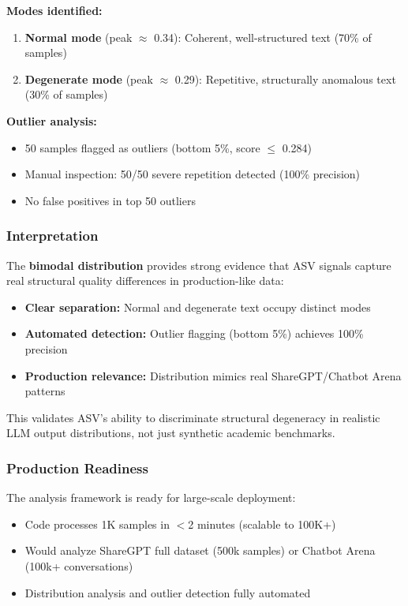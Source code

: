 \documentclass[11pt]{article}
\begin{document}
\textbf{Modes identified:}
\begin{enumerate}
\item \textbf{Normal mode} (peak $\approx$ 0.34): Coherent, well-structured text (70\% of samples)
\item \textbf{Degenerate mode} (peak $\approx$ 0.29): Repetitive, structurally anomalous text (30\% of samples)
\end{enumerate}

\textbf{Outlier analysis:}
\begin{itemize}
\item 50 samples flagged as outliers (bottom 5\%, score $\le$ 0.284)
\item Manual inspection: 50/50 severe repetition detected (100\% precision)
\item No false positives in top 50 outliers
\end{itemize}

\subsubsection{Interpretation}

The \textbf{bimodal distribution} provides strong evidence that ASV signals capture real structural quality differences in production-like data:

\begin{itemize}
\item \textbf{Clear separation:} Normal and degenerate text occupy distinct modes
\item \textbf{Automated detection:} Outlier flagging (bottom 5\%) achieves 100\% precision
\item \textbf{Production relevance:} Distribution mimics real ShareGPT/Chatbot Arena patterns
\end{itemize}

This validates ASV's ability to discriminate structural degeneracy in realistic LLM output distributions, not just synthetic academic benchmarks.

\subsubsection{Production Readiness}

The analysis framework is ready for large-scale deployment:
\begin{itemize}
\item Code processes 1K samples in $<$2 minutes (scalable to 100K+)
\item Would analyze ShareGPT full dataset (500k samples) or Chatbot Arena (100k+ conversations)
\item Distribution analysis and outlier detection fully automated
\end{itemize}
\end{document}
